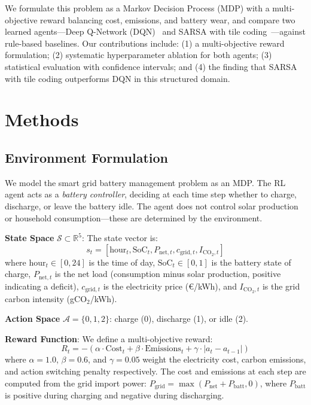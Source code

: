 \documentclass[runningheads]{llncs}
\begin{document}
We formulate this problem as a Markov Decision Process (MDP) with a multi-objective reward balancing cost, emissions, and battery wear, and compare two learned agents---Deep Q-Network (DQN)~\cite{mnih2015dqn} and SARSA with tile coding~\cite{sutton2018rl}---against rule-based baselines. Our contributions include: (1) a multi-objective reward formulation; (2) systematic hyperparameter ablation for both agents; (3) statistical evaluation with confidence intervals; and (4) the finding that SARSA with tile coding outperforms DQN in this structured domain.

\section{Methods}

\subsection{Environment Formulation}

We model the smart grid battery management problem as an MDP. The RL agent acts as a \emph{battery controller}, deciding at each time step whether to charge, discharge, or leave the battery idle. The agent does not control solar production or household consumption---these are determined by the environment.

\textbf{State Space} $\mathcal{S} \subset \mathbb{R}^5$: The state vector is:
\begin{equation}
    s_t = [\text{hour}_t, \text{SoC}_t, P_{\text{net},t}, c_{\text{grid},t}, I_{\text{CO}_2,t}]
\end{equation}
where $\text{hour}_t \in [0, 24]$ is the time of day, $\text{SoC}_t \in [0, 1]$ is the battery state of charge, $P_{\text{net},t}$ is the net load (consumption minus solar production, positive indicating a deficit), $c_{\text{grid},t}$ is the electricity price (\euro{}/kWh), and $I_{\text{CO}_2,t}$ is the grid carbon intensity (gCO$_2$/kWh).

\textbf{Action Space} $\mathcal{A} = \{0, 1, 2\}$: charge (0), discharge (1), or idle (2).

\textbf{Reward Function}: We define a multi-objective reward:
\begin{equation}
    R_t = -(\alpha \cdot \text{Cost}_t + \beta \cdot \text{Emissions}_t + \gamma \cdot |a_t - a_{t-1}|)
\end{equation}
where $\alpha = 1.0$, $\beta = 0.6$, and $\gamma = 0.05$ weight the electricity cost, carbon emissions, and action switching penalty respectively. The cost and emissions at each step are computed from the grid import power: $P_{\text{grid}} = \max(P_{\text{net}} + P_{\text{batt}}, 0)$, where $P_{\text{batt}}$ is positive during charging and negative during discharging.
\end{document}
